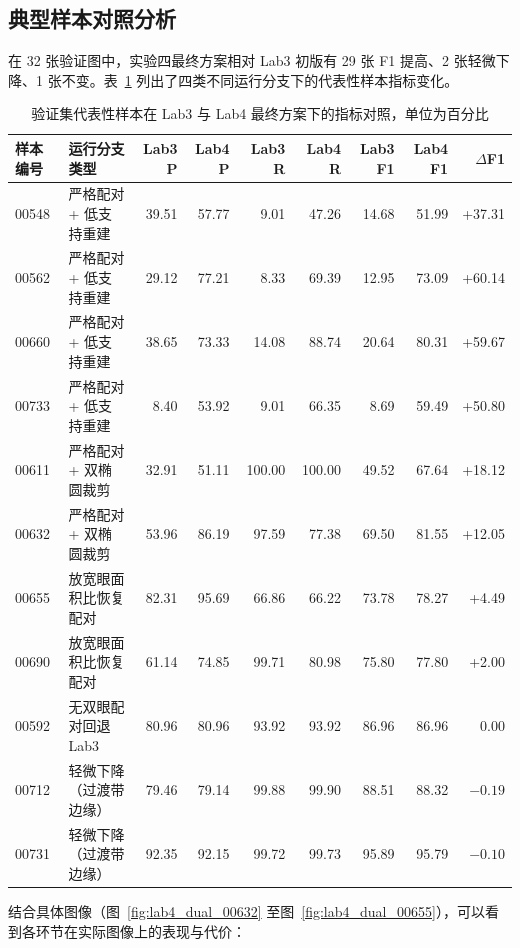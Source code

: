 \subsection{典型样本对照分析}

在 32 张验证图中，实验四最终方案相对 Lab3 初版有 29 张 F1 提高、2 张轻微下降、1 张不变。表~\ref{tab:lab4_cases} 列出了四类不同运行分支下的代表性样本指标变化。

\begin{table}[H]
\centering\small
\setlength{\tabcolsep}{3.5pt}
\caption{验证集代表性样本在 Lab3 与 Lab4 最终方案下的指标对照，单位为百分比}\label{tab:lab4_cases}
\begin{tabular}{llrrrrrrr}
\toprule
样本编号 & 运行分支类型 & Lab3 P & Lab4 P & Lab3 R & Lab4 R & Lab3 F1 & Lab4 F1 & $\Delta$F1 \\
\midrule
00548 & 严格配对 + 低支持重建 & 39.51 & 57.77 & 9.01 & 47.26 & 14.68 & 51.99 & +37.31 \\
00562 & 严格配对 + 低支持重建 & 29.12 & 77.21 & 8.33 & 69.39 & 12.95 & 73.09 & +60.14 \\
00660 & 严格配对 + 低支持重建 & 38.65 & 73.33 & 14.08 & 88.74 & 20.64 & 80.31 & +59.67 \\
00733 & 严格配对 + 低支持重建 & 8.40 & 53.92 & 9.01 & 66.35 & 8.69 & 59.49 & +50.80 \\
00611 & 严格配对 + 双椭圆裁剪 & 32.91 & 51.11 & 100.00 & 100.00 & 49.52 & 67.64 & +18.12 \\
00632 & 严格配对 + 双椭圆裁剪 & 53.96 & 86.19 & 97.59 & 77.38 & 69.50 & 81.55 & +12.05 \\
00655 & 放宽眼面积比恢复配对 & 82.31 & 95.69 & 66.86 & 66.22 & 73.78 & 78.27 & +4.49 \\
00690 & 放宽眼面积比恢复配对 & 61.14 & 74.85 & 99.71 & 80.98 & 75.80 & 77.80 & +2.00 \\
00592 & 无双眼配对回退 Lab3 & 80.96 & 80.96 & 93.92 & 93.92 & 86.96 & 86.96 & 0.00 \\
00712 & 轻微下降（过渡带边缘） & 79.46 & 79.14 & 99.88 & 99.90 & 88.51 & 88.32 & $-0.19$ \\
00731 & 轻微下降（过渡带边缘） & 92.35 & 92.15 & 99.72 & 99.73 & 95.89 & 95.79 & $-0.10$ \\
\bottomrule
\end{tabular}
\end{table}

结合具体图像（图~\ref{fig:lab4_dual_00632} 至图~\ref{fig:lab4_dual_00655}），可以看到各环节在实际图像上的表现与代价：

